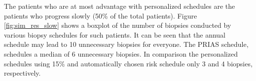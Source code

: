 The patients who are at most advantage with personalized schedules are the patients who progress slowly (50\% of the total patients). Figure \ref{fig:sim_res_slow} shows a boxplot of the number of biopsies conducted by various biopsy schedules for such patients. It can be seen that the annual schedule may lead to 10 unnecessary biopsies for everyone. The PRIAS schedule, schedules a median of 6 unnecessary biopsies. In comparison the personalized schedules using 15\% and automatically chosen risk schedule only 3 and 4 biopsies, respectively.